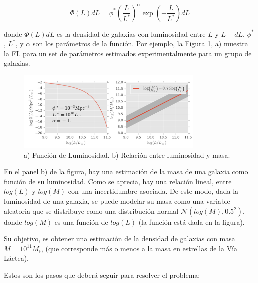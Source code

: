 \documentclass[letter, 11pt]{article}
\begin{document}
$$ \Phi(L) dL = \phi^* \left( \frac{L}{L^*}\right)^\alpha
                \exp\left(- \frac{L}{L^*}\right) dL$$

\noindent donde $\Phi(L)dL$ es la densidad de galaxias con luminosidad entre
$L$ y $L+dL$. $\phi^*$, $L^*$, y $\alpha$ son los parámetros de la función. Por
ejemplo, la Figura \ref{fig:LF}, a) muestra la FL para un set de parámetros
estimados experimentalmente para un grupo de galaxias.

\begin{figure}
  \centering
  \includegraphics[width=0.8\textwidth]{lf.pdf}
  \caption{a) Función de Luminosidad. b) Relación entre luminosidad y masa.}
  \label{fig:LF}
\end{figure}

En el panel b) de la figura, hay una estimación de la masa de una galaxia como
función de su luminosidad. Como se aprecia, hay una relación lineal, entre
$log(L)$ y $log(M)$ con una incertidumbre asociada. De este modo, dada la
luminosidad de una galaxia, se puede modelar su masa como una variable
aleatoria que se distribuye como una distribución normal $\mathcal{N}(log(M),
0.5^2)$, donde $log(M)$ es una función de $log(L)$ (la función está dada en la
figura).

Su objetivo, es obtener una estimación de la densidad de galaxias con masa
$M=10^{11} M_\odot$ (que corresponde más o menos a la masa en estrellas de la
Vía Láctea).

Estos son los pasos que deberá seguir para resolver el problema:
\end{document}

